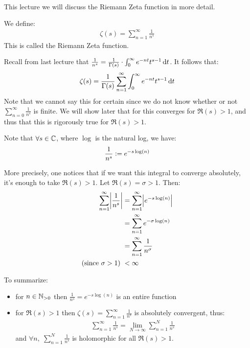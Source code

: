 \setcounter{section}{0}
\setcounter{theorem}{0}

This lecture we will discuss the Riemann Zeta function in more detail.

\begin{definition}
We define:
\begin{align*}
    \zeta(s) = \sum_{n=1}^\infty \frac{1}{n^s}
\end{align*}
This is called the Riemann Zeta function.

\end{definition}

\begin{remark}
Recall from last lecture that $\frac{1}{n^s} = \frac{1}{\Gamma(s) } \cdot \int_0^\infty e^{-nt} t^{s-1} \dif t$. It follows that:
\begin{align*}
    \zeta(s) = \frac{1}{\Gamma(s) } \sum_{n=1}^\infty \int_0^\infty e^{-nt} t^{s-1} \dif t
\end{align*}
Note that we cannot say this for certain since we do not know whether or not $\sum_{n=0}^\infty \frac{1}{n^s}$ is finite. We will show later that for this converges for $\Re(s) >1$, and thus that this is rigorously true for $\Re(s) >1$.
\end{remark}

 Note that $\forall s \in \mathbb{C}$, where $\log$ is the natural log, we have:
\begin{align*}
    \frac{1}{n^s} \vcentcolon = e^{- s \log(n)}
\end{align*}

More precisely, one notices that if we want this integral to converge absolutely, it's enough to take $\Re(s) > 1$. Let $\Re(s) = \sigma > 1$. Then:
\begin{align*}
    \sum_{n=1}^\infty \abs{\frac{1}{n^s}} &= \sum_{n=1}^\infty \abs{e^{-s \log(n)}}\\
    &= \sum_{n=1}^\infty e^{- \sigma \log(n)}\\ &= \sum_{n=1}^\infty \frac{1}{n^\sigma}\\ \text{(since $\sigma > 1$) } &< \infty
\end{align*}

To summarize:
\begin{itemize}
    \item for $n \in \mathbb{N}_{>0}$ then $\frac{1}{n^s} = e^{- s \log (n)}$ is an entire function
    \item for $\Re(s) > 1$ then $\zeta(s) = \sum_{n=1}^\infty \frac{1}{n^s}$ is absolutely convergent, thus:
    \begin{align*}
        \sum_{n=1}^\infty \frac{1}{n^s} = \lim_{N \to \infty} \sum_{n=1}^N \frac{1}{n^s}
    \end{align*}
    and $\forall n, \; \sum_{n=1}^N \frac{1}{n^s}$ is holomorphic for all $\Re(s) >1$.
\end{itemize}

